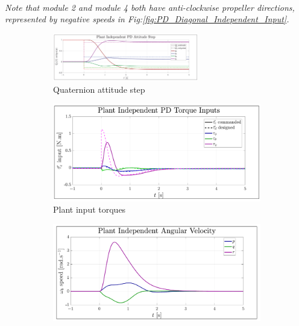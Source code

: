 \\
\emph{\color{Gray}Note that module 2 and module 4 both have anti-clockwise propeller directions, represented by negative speeds in Fig:\ref{fig:PD_Diagonal_Independent_Input}. }
\\
\begin{figure}[htbp]
\vspace{-22pt}
\centering
\begin{subfigure}{\textwidth}
\centering
\includegraphics[width=0.7\textwidth]{graphs/PD_Diagonal_Independent_Step}
\vspace{-6pt}
\caption{Quaternion attitude step}
\label{fig:PD_Diagonal_Independent_Step}
\end{subfigure}
\begin{subfigure}{0.49\textwidth}
\centering
\includegraphics[width=\textwidth]{graphs/PD_Diagonal_Independent_Torque}
\vspace{-20pt}
\caption{Plant input torques}
\label{fig:PD_Diagonal_Independent_Torque}
\end{subfigure}
\begin{subfigure}{0.49\textwidth}
\centering
\includegraphics[width=\textwidth]{graphs/PD_Diagonal_Independent_Angular}

\end{subfigure}
\end{figure}
